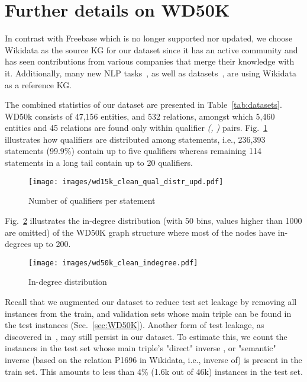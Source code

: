 \documentclass[11pt,a4paper]{article}
\begin{document}




\clearpage
\appendix


\section{Further details on WD50K}
\label{app:dataset}
In contrast with Freebase which is no longer supported nor updated, we choose Wikidata as the source KG for our dataset since it has an active community and has seen contributions from various companies that merge their knowledge with it. Additionally, many new NLP tasks~\citep{Xiong2020Pretrained, DBLP:journals/corr/abs-1908-07690, DBLP:journals/corr/abs-1907-09361}, as well as datasets~\citep{DBLP:journals/corr/abs-1911-06136, DBLP:conf/emnlp/MesquitaCSMB19, dubey2019lc}, are using Wikidata as a reference KG.


The combined statistics of our dataset are presented in Table~\ref{tab:datasets}. WD50k consists of 47,156 entities, and 532 relations, amongst which 5,460 entities and 45 relations are found only within qualifier \textit{(, )} pairs.
Fig.~\ref{fig:WD50K_quals_distr} illustrates how qualifiers are distributed among statements, i.e., 236,393 statements (99.9\%) contain up to five qualifiers whereas remaining 114 statements in a long tail contain up to 20 qualifiers.
\begin{figure}[!h]
    \centering
    \texttt{[image: images/wd15k\_clean\_qual\_distr\_upd.pdf]}
    \caption{Number of qualifiers per statement}
    \label{fig:WD50K_quals_distr}
\end{figure}
Fig.~\ref{fig:WD50K_indegree} illustrates the in-degree distribution (with 50 bins, values higher than 1000 are omitted) of the WD50K graph structure where most of the nodes have in-degrees up to 200.
\begin{figure}[!h]
    \centering
    \texttt{[image: images/wd50k\_clean\_indegree.pdf]}
    \caption{In-degree distribution}
    \label{fig:WD50K_indegree}
\end{figure}

Recall that we augmented our dataset to reduce test set leakage by removing all instances from the train, and validation sets whose main triple  can be found in the test instances (Sec.~\ref{sec:WD50K}). 
Another form of test leakage, as discovered in~\cite{toutanova2015observed}, may still persist in our dataset. 
To estimate this,  we count the instances in the test set whose main triple's  "direct" inverse , or "semantic" inverse (based on the relation P1696 in Wikidata, i.e., inverse of) is present in the train set. This amounts to less than 4\% (1.6k out of 46k) instances in the test set. 
\end{document}
